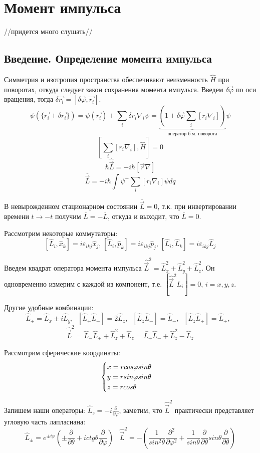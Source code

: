 \newpage
\chapter{Момент импульса}
\par //придется много слушать//
\section{Введение. Определение момента импульса}
\par Симметрия и изотропия пространства обеспечивают неизменность $\hat{H}$ при поворотах, откуда следует закон сохранения момента импульса. Введем $\delta \vec{\varphi}$ по оси вращения, тогда $\delta \vec{r_i} = [\delta \vec{\varphi}, \vec{r_i}]$.
$$\psi(\{\vec{r_i}+\delta \vec{r_i}\})= \psi(\vec{r_i})+\sum_i \delta r_i \nabla_i \psi = \underbrace{(1+\delta \vec{\varphi} \sum_i [r_i \nabla_i])}_{\text{оператор б.м. поворота}} \psi$$
$$\left[\sum_i [r_i \nabla_i], \hat{H}\right]=0$$
$$\hbar \hat{\vec{L}} = -i \hbar [\vec{r}\nabla]$$
$$\overline{\vec{L}}= -i \hbar \int \psi^+ \sum_i [r_i \nabla_i] \psi dq$$
\par В невырожденном стационарном состоянии $\overline{\vec{L}} = 0$, т.к. при инвертировании времени $t \rightarrow - t$ получим $\overline{L}=-\overline{L}$, откуда и выходит, что $\overline{L} = 0$.
\par Рассмотрим некоторые коммутаторы:
$$ [\hat{L}_i, \hat{x}_k]=i \varepsilon_{ikj}\hat{x}_j \text{,}\; [\hat{L}_i, \hat{p}_k] = i \varepsilon_{ikj}\hat{p}_j \text{,}\; [\hat{L}_i, \hat{L}_k] = i \varepsilon_{ikj}\hat{L}_j$$
\par Введем квадрат оператора момента импульса $\hat{\vec{L}}^2=\hat{L}^2_x+\hat{L}^2_y+\hat{L}^2_z$. Он одновременно измерим с каждой из компонент, т.е. $[\hat{\vec{L}}^2 L_i]=0$, $i=x,y,z$.
\par Другие удобные комбинации:
$$\hat{L}_{\pm}=\hat{L}_x\pm i \hat{L}_y, \; \; [\hat{L}_+\hat{L}_-]=2\hat{L}_z, \;\; [\hat{L}_z\hat{L}_-]=\hat{L}_-, \;\; [\hat{L}_z\hat{L}_+]=\hat{L}_+,\; \;$$
$$ \hat{\vec{L}}^2= \hat{L}_-\hat{L}_+ + \hat{L}^2_z+\hat{L}_z = \hat{L}_+\hat{L}_- + \hat{L}^2_z-\hat{L}_z$$
\par Рассмотрим сферические координаты:
\begin{equation*}
 \begin{cases}
    $$ x= r cos \varphi sin \theta $$
\\
    $$ y= r sin \varphi sin \theta $$ 
\\
    $$z= r cos \theta$$
 \end{cases}
\end{equation*}
\par Запишем наши операторы: $\hat{L}_z=-i \frac{\partial}{\partial \varphi}$, заметим, что $\hat{\vec{L}}^2$ практически представляет угловую часть лапласиана:
$$\hat{L}_{\pm} = e^{\pm i \varphi} \left(\pm \frac{\partial}{\partial \theta} + i ctg \theta \frac{\partial}{\partial \varphi} \right) \; \;\; \hat{\vec{L}}^2 = - \left(\frac{1}{sin^2\theta} \frac{\partial^2}{\partial \varphi^2} +\frac{1}{sin\theta} \frac{\partial}{\partial \theta}sin \theta \frac{\partial}{\partial \theta} \right)$$
